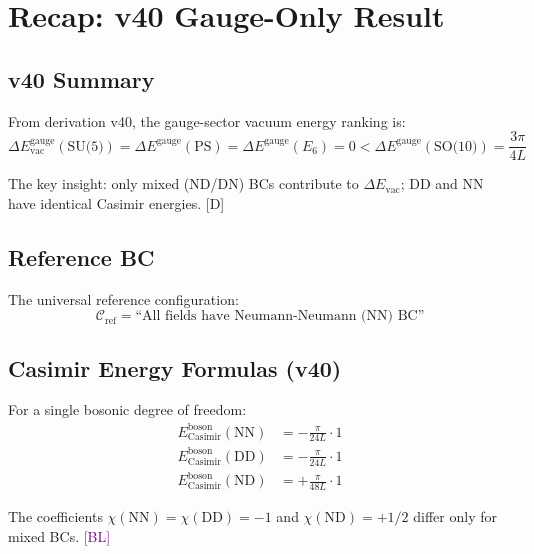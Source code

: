 \documentclass[11pt,a4paper]{article}
\newcommand{\tagD}{\textcolor{blue!70!black}{[D]}}
\newcommand{\tagBL}{\textcolor{purple}{[BL]}}
\begin{document}
\section{Recap: v40 Gauge-Only Result}
\label{sec:v40-recap}

\subsection{v40 Summary}

From derivation v40, the gauge-sector vacuum energy ranking is:
\begin{equation}
\label{eq:v40-result}
\Delta E_{\text{vac}}^{\text{gauge}}(\text{SU(5)}) = \Delta E^{\text{gauge}}(\text{PS})
= \Delta E^{\text{gauge}}(E_6) = 0 < \Delta E^{\text{gauge}}(\text{SO(10)}) = \frac{3\pi}{4L}
\end{equation}

The key insight: only mixed (ND/DN) BCs contribute to $\Delta E_{\text{vac}}$; DD and NN
have identical Casimir energies. \tagD

\subsection{Reference BC}

The universal reference configuration:
\begin{equation}
\label{eq:ref-bc}
\mathcal{C}_{\text{ref}} = \text{``All fields have Neumann-Neumann (NN) BC''}
\end{equation}

\subsection{Casimir Energy Formulas (v40)}

For a single bosonic degree of freedom:
\begin{align}
\label{eq:chi-NN-recap}
E_{\text{Casimir}}^{\text{boson}}(\text{NN}) &= -\frac{\pi}{24L} \cdot 1 \\
\label{eq:chi-DD-recap}
E_{\text{Casimir}}^{\text{boson}}(\text{DD}) &= -\frac{\pi}{24L} \cdot 1 \\
\label{eq:chi-ND-recap}
E_{\text{Casimir}}^{\text{boson}}(\text{ND}) &= +\frac{\pi}{48L} \cdot 1
\end{align}

The coefficients $\chi(\text{NN}) = \chi(\text{DD}) = -1$ and $\chi(\text{ND}) = +1/2$
differ only for mixed BCs. \tagBL
\end{document}
